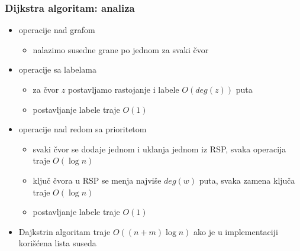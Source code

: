 \documentclass[compress]{beamer}
\begin{document}
\begin{frame}[fragile]
  \frametitle{Dijkstra algoritam: analiza}
  \begin{itemize}
    \item operacije nad grafom
    \begin{itemize}
      \item nalazimo susedne grane po jednom za svaki čvor
    \end{itemize}
    \item operacije sa labelama
    \begin{itemize}
      \item za čvor $z$ postavljamo rastojanje i labele $O(deg(z))$ puta
      \item postavljanje labele traje $O(1)$
    \end{itemize}
    \item operacije nad redom sa prioritetom
    \begin{itemize}
      \item svaki čvor se dodaje jednom i uklanja jednom iz RSP, svaka 
        operacija traje $O(\log n)$
      \item ključ čvora u RSP se menja najviše $deg(w)$ puta, svaka 
        zamena ključa traje $O(\log n)$
      \item postavljanje labele traje $O(1)$
    \end{itemize}
    \item Dajkstrin algoritam traje $O((n+m)\log n)$ ako je u 
      implementaciji korišćena lista suseda
  \end{itemize}
\end{frame}
\end{document}
